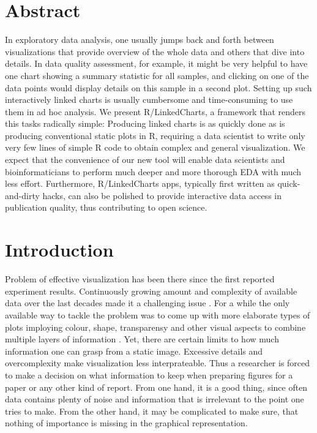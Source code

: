 \documentclass[twocolumn,10pt]{article}
\begin{document}
\setcounter{secnumdepth}{0}



\section{Abstract}
In exploratory data analysis, one usually jumps back and forth between visualizations that provide overview of the whole data and others that dive into details. In data quality assessment, for example, it might be very helpful to have one chart showing a summary statistic for all samples, and clicking on one of the data points would display details on this sample in a second plot. Setting up such interactively linked charts is usually cumbersome and time-consuming to use them in ad hoc analysis. We present R/LinkedCharts, a framework  that renders this tasks radically simple: Producing linked charts is as quickly done as is producing conventional static plots in R, requiring a data scientist to write only very few lines of simple R code to obtain complex and general visualization. We expect that the convenience of our new tool will enable data scientists and bioinformaticians to perform much deeper and more thorough EDA with much less effort. Furthermore, R/LinkedCharts apps, typically first written as quick-and-dirty hacks, can also be polished to provide interactive data access in publication quality, thus contributing to open science.

\section{Introduction}

Problem of effective visualization has been there since the first reported experiment results. Continuously growing amount and complexity of available data over the last decades made it a challenging issue \citep{fisher_2017}. For a while the only available way to tackle the problem was to come up with more elaborate types of plots imploying colour, shape, transparensy and other visual aspects to combine multiple layers of information \citep{keahey_2013}. Yet, there are certain limits to how much information one can grasp from a static image. Excessive details and overcomplexity make visualization less interprateable. Thus a researcher is forced to make a decision on what information to keep when preparing figures for a paper or any other kind of report. From one hand, it is a good thing, since often data contains plenty of noise and information that is irrelevant to the point one tries to make. From the other hand, it may be complicated to make sure, that nothing of importance is missing in the graphical representation.
\end{document}
